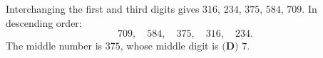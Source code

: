 Interchanging the first and third digits gives $316$, $234$, $375$, $584$, $709$. In descending order:
\[709,\quad584,\quad375,\quad316,\quad234.\]
The middle number is $375$, whose middle digit is $\boxed{\textbf{(D) }7}$.
